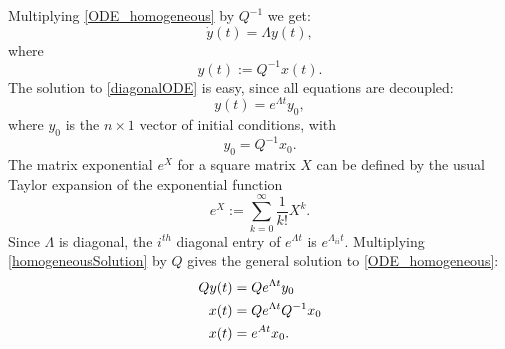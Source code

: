 \documentclass[../../lecture_notes.tex]{subfiles}
\begin{document}
Multiplying \eqref{ODE_homogeneous} by $Q^{-1}$ we get:
\begin{equation}
  \dot{y}(t)=\Lambda y(t),
  \label{diagonalODE}
\end{equation}
where
\begin{equation*}
  y(t):= Q^{-1}x(t).
\end{equation*}
The solution to \eqref{diagonalODE} is easy, since all equations are decoupled:
\begin{equation}
  y(t)=e^{\Lambda t}y_{0},
  \label{homogeneousSolution}
\end{equation}
where $y_{0}$ is the $n\times 1$ vector of initial conditions, with
\begin{equation*}
  y_{0}=Q^{-1}x_{0}.
\end{equation*}
The matrix exponential $e^{X}$ for a square matrix $X$ can be defined by the usual Taylor expansion of the exponential function
\begin{equation*}
  e^{X}:= \sum_{k=0}^{\infty}\frac{1}{k!}X^{k}.
\end{equation*}
Since $\Lambda$ is diagonal, the $i^{th}$ diagonal entry of $e^{\Lambda t}$ is $e^{\Lambda_{ii}t}$.
Multiplying \eqref{homogeneousSolution} by $Q$ gives the general solution to \eqref{ODE_homogeneous}:
\begin{align}
  Qy(t) &=Qe^{\Lambda t}y_{0} \notag \\
  x(t) &=Qe^{\Lambda t}Q^{-1}x_{0} \notag \\
  x(t) &=e^{At}x_{0}.
  \label{x_homogeneousSolution}
\end{align}
\end{document}
